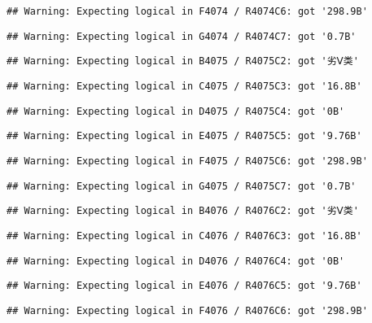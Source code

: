 \documentclass[
]{article}
\begin{document}
\begin{verbatim}
## Warning: Expecting logical in F4074 / R4074C6: got '298.9B'
\end{verbatim}

\begin{verbatim}
## Warning: Expecting logical in G4074 / R4074C7: got '0.7B'
\end{verbatim}

\begin{verbatim}
## Warning: Expecting logical in B4075 / R4075C2: got '劣Ⅴ类'
\end{verbatim}

\begin{verbatim}
## Warning: Expecting logical in C4075 / R4075C3: got '16.8B'
\end{verbatim}

\begin{verbatim}
## Warning: Expecting logical in D4075 / R4075C4: got '0B'
\end{verbatim}

\begin{verbatim}
## Warning: Expecting logical in E4075 / R4075C5: got '9.76B'
\end{verbatim}

\begin{verbatim}
## Warning: Expecting logical in F4075 / R4075C6: got '298.9B'
\end{verbatim}

\begin{verbatim}
## Warning: Expecting logical in G4075 / R4075C7: got '0.7B'
\end{verbatim}

\begin{verbatim}
## Warning: Expecting logical in B4076 / R4076C2: got '劣Ⅴ类'
\end{verbatim}

\begin{verbatim}
## Warning: Expecting logical in C4076 / R4076C3: got '16.8B'
\end{verbatim}

\begin{verbatim}
## Warning: Expecting logical in D4076 / R4076C4: got '0B'
\end{verbatim}

\begin{verbatim}
## Warning: Expecting logical in E4076 / R4076C5: got '9.76B'
\end{verbatim}

\begin{verbatim}
## Warning: Expecting logical in F4076 / R4076C6: got '298.9B'
\end{verbatim}
\end{document}
